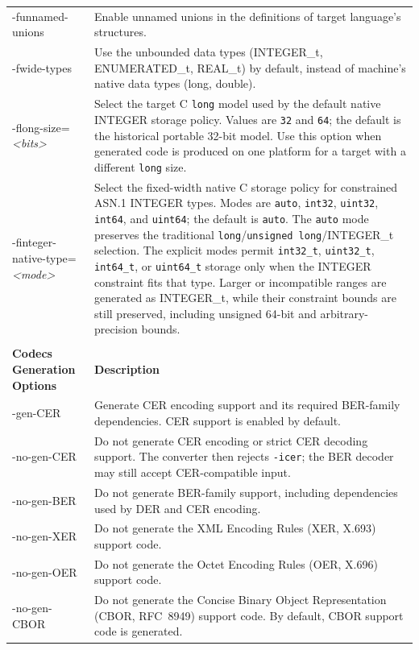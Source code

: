 \documentclass[english,oneside,12pt]{book}
\begin{document}
\begin{longtable}{lp{4in}}
{\ttfamily -funnamed-unions} & {\small Enable  unnamed  unions in the definitions of target language's structures.}\\
{\ttfamily -fwide-types} & {\small Use the unbounded data types (INTEGER\_t, ENUMERATED\_t, REAL\_t) by default, instead of machine's native data types (long, double).}\\
{\ttfamily -flong-size=\emph{<bits>}} & {\small Select the target C \texttt{long} model used by the default native INTEGER storage policy. Values are \texttt{32} and \texttt{64}; the default is the historical portable 32-bit model. Use this option when generated code is produced on one platform for a target with a different \texttt{long} size.}\\
{\ttfamily -finteger-native-type=\emph{<mode>}} & {\small Select the fixed-width native C storage policy for constrained ASN.1 INTEGER types. Modes are \texttt{auto}, \texttt{int32}, \texttt{uint32}, \texttt{int64}, and \texttt{uint64}; the default is \texttt{auto}. The \texttt{auto} mode preserves the traditional \texttt{long}/\texttt{unsigned long}/INTEGER\_t selection. The explicit modes permit \texttt{int32\_t}, \texttt{uint32\_t}, \texttt{int64\_t}, or \texttt{uint64\_t} storage only when the INTEGER constraint fits that type. Larger or incompatible ranges are generated as INTEGER\_t, while their constraint bounds are still preserved, including unsigned 64-bit and arbitrary-precision bounds.}\\\\
\textbf{Codecs Generation Options} & \textbf{Description}\\
\midrule
{\ttfamily -gen-CER} & {\small Generate CER encoding support and its required BER-family
dependencies. CER support is enabled by default.}\\
{\ttfamily -no-gen-CER} & {\small Do not generate CER encoding or strict CER decoding support.
The converter then rejects \texttt{-icer}; the BER decoder may still accept CER-compatible input.}\\
{\ttfamily -no-gen-BER} & {\small Do not generate BER-family support, including dependencies used
by DER and CER encoding.}\\
{\ttfamily -no-gen-XER} & {\small Do not generate the XML Encoding Rules (XER, X.693) support code.}\\
{\ttfamily -no-gen-OER} & {\small Do not generate the Octet Encoding Rules (OER, X.696) support code.}\\
{\ttfamily -no-gen-CBOR} & {\small Do not generate the Concise Binary Object Representation (CBOR, RFC~8949) support code. By default, CBOR support code is generated.}\\

\end{longtable}
\end{document}
